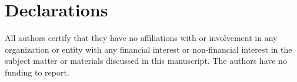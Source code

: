 
\section{Declarations}
All authors certify that they have no affiliations with or involvement in any organization or entity with any financial interest or non-financial interest in the subject matter or materials discussed in this manuscript. The authors have no funding to report.